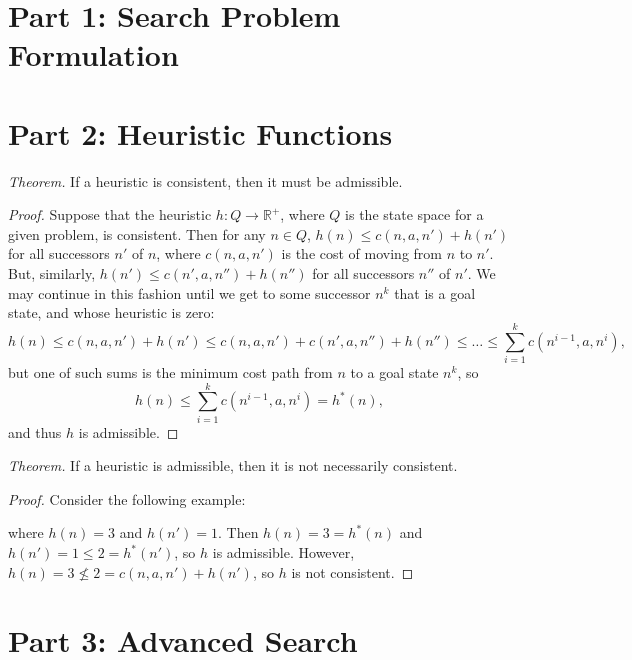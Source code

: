 \documentclass[11pt]{amsart}
\begin{document}
\maketitle

\section*{Part 1: Search Problem Formulation}

\section*{Part 2: Heuristic Functions}

\emph{Theorem.}
If a heuristic is consistent, then it must be admissible.

\begin{proof}
Suppose that the heuristic $h: Q \rightarrow \mathbb{R}^+$, where $Q$ is the state space for a given
problem, is consistent.  Then for any $n \in Q$, $h(n) \leq c(n, a, n') + h(n')$ for all successors
$n'$ of $n$, where $c(n, a, n')$ is the cost of moving from $n$ to $n'$.  But, similarly, $h(n') \leq
c(n', a, n'') + h(n'')$ for all successors $n''$ of $n'$.  We may continue in this fashion until we
get to some successor $n^k$ that is a goal state, and whose heuristic is zero:
\[
h(n) \leq c(n, a, n') + h(n') \leq c(n, a, n') + c(n', a, n'') + h(n'') \leq \dots \leq
\sum_{i = 1}^k c(n^{i-1}, a, n^i),
\]
but one of such sums is the minimum cost path from $n$ to a goal state $n^k$, so
\[
h(n) \leq \sum_{i = 1}^k c(n^{i-1}, a, n^i) = h^*(n),
\]
and thus $h$ is admissible.
\end{proof}

\emph{Theorem.}
If a heuristic is admissible, then it is not necessarily consistent.

\begin{proof}
Consider the following example:

\vspace*{1in}

where $h(n) = 3$ and $h(n') = 1$.  Then $h(n) = 3 = h^*(n)$ and $h(n') = 1 \leq 2 = h^*(n')$,
so $h$ is admissible.  However, $h(n) = 3 \nleq 2 = c(n, a, n') + h(n')$, so $h$ is not consistent.
\end{proof}

\section*{Part 3: Advanced Search}
\end{document}
